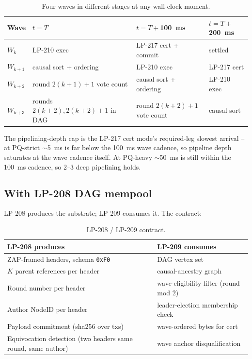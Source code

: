 \begin{table}[h]
\centering
\small
\begin{tabular}{@{}lp{2.5cm}p{2.5cm}p{2.5cm}@{}}
\toprule
\textbf{Wave} & \textbf{$t{=}T$} & \textbf{$t{=}T{+}$\SI{100}{\milli\second}} & \textbf{$t{=}T{+}$\SI{200}{\milli\second}} \\
\midrule
$W_k$ & LP-210 exec & LP-217 cert + commit & settled \\
$W_{k{+}1}$ & causal sort + ordering & LP-210 exec & LP-217 cert \\
$W_{k{+}2}$ & round $2(k{+}1){+}1$ vote count & causal sort + ordering & LP-210 exec \\
$W_{k{+}3}$ & rounds $2(k{+}2),2(k{+}2){+}1$ in DAG & round $2(k{+}2){+}1$ vote count & causal sort \\
\bottomrule
\end{tabular}
\caption{Four waves in different stages at any wall-clock moment.}
\label{tab:pipeline-waves}
\end{table}

The pipelining-depth cap is the LP-217 cert mode's required-leg
slowest arrival -- at PQ-strict $\sim$\SI{5}{\milli\second} is far
below the \SI{100}{\milli\second} wave cadence, so pipeline depth
saturates at the wave cadence itself. At PQ-heavy
$\sim$\SI{50}{\milli\second} is still within the
\SI{100}{\milli\second} cadence, so 2--3 deep pipelining holds.

\subsection{With LP-208 DAG mempool}

LP-208 produces the substrate; LP-209 consumes it. The contract:

\begin{table}[h]
\centering
\small
\begin{tabular}{@{}p{6cm}p{6cm}@{}}
\toprule
\textbf{LP-208 produces} & \textbf{LP-209 consumes} \\
\midrule
ZAP-framed headers, schema \texttt{0xF0} & DAG vertex set \\
$K$ parent references per header & causal-ancestry graph \\
Round number per header & wave-eligibility filter (round mod 2) \\
Author NodeID per header & leader-election membership check \\
Payload commitment (sha256 over txs) & wave-ordered bytes for cert \\
Equivocation detection (two headers same round, same author) & wave anchor disqualification \\
\bottomrule
\end{tabular}
\caption{LP-208 / LP-209 contract.}
\label{tab:lp208-209}
\end{table}

